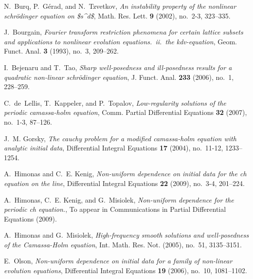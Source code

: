 \documentclass[12pt,reqno]{amsart}
\begin{document}
\begin{thebibliography}{dLKT07}

N.~Burq, P.~G{\'e}rad, and N.~Tzvetkov, \emph{An instability property of the
  nonlinear schr{\"o}dinger equation on {\$}s\^{}d{\$}}, Math. Res. Lett.
  \textbf{9} (2002), no.~2-3, 323--335.

J.~Bourgain, \emph{Fourier transform restriction phenomena for certain lattice
  subsets and applications to nonlinear evolution equations.\ ii.\ the
  kdv-equation}, Geom. Funct. Anal. \textbf{3} (1993), no.~3, 209--262.

I.~Bejenaru and T.~Tao, \emph{Sharp well-posedness and ill-posedness results
  for a quadratic non-linear schr{\"o}dinger equation}, J. Funct. Anal.
  \textbf{233} (2006), no.~1, 228--259.

C.~de~Lellis, T.~Kappeler, and P.~Topalov, \emph{Low-regularity solutions of
  the periodic camassa-holm equation}, Comm. Partial Differential Equations
  \textbf{32} (2007), no.~1-3, 87--126.

J.~M. Gorsky, \emph{The cauchy problem for a modified camassa-holm equation
  with analytic initial data}, Differential Integral Equations \textbf{17}
  (2004), no.~11-12, 1233--1254.

A.~Himonas and C.~E. Kenig, \emph{Non-uniform dependence on initial data for
  the ch equation on the line}, Differential Integral Equations \textbf{22}
  (2009), no.~3-4, 201--224.

A.~Himonas, C.~E. Kenig, and G.~Misiolek, \emph{Non-uniform dependence for the
  periodic ch equation.}, To appear in Communications in Partial Differential
  Equations (2009).

A.~Himonas and G.~Misiolek, \emph{High-frequency smooth solutions and
  well-posedness of the {C}amassa-{H}olm equation}, Int. Math. Res. Not.
  (2005), no.~51, 3135--3151. 

E.~Olson, \emph{Non-uniform dependence on initial data for a family of
  non-linear evolution equations}, Differential Integral Equations \textbf{19}
  (2006), no.~10, 1081--1102.

\end{thebibliography}
%
%
\end{document}
